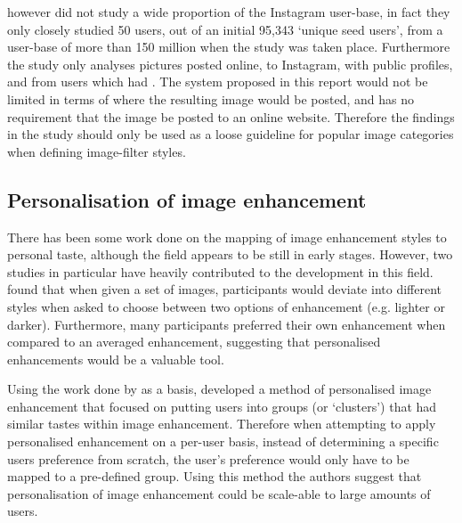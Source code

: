 \documentclass[a4paper,12pt]{report}
\begin{document}
      \cite{hu2014we} however did not study a wide proportion of the Instagram user-base, in fact they only closely studied 50 users, out of an initial 95,343 ‘unique seed users’, from a user-base of more than 150 million when the study was taken place. Furthermore the study only analyses pictures posted online, to Instagram, with public profiles, and from users which had . The system proposed in this report would not be limited in terms of where the resulting image would be posted, and has no requirement that the image be posted to an online website. Therefore the findings in the study should only be used as a loose guideline for popular image categories when defining image-filter styles.

    \subsection{Personalisation of image enhancement}
      There has been some work done on the mapping of image enhancement styles to personal taste, although the field appears to be still in early stages. However, two studies in particular have heavily contributed to the development in this field. \cite{kang2010personalization} found that when given a set of images, participants would deviate into different styles when asked to choose between two options of enhancement (e.g. lighter or darker). Furthermore, many participants preferred their own enhancement when compared to an averaged enhancement, suggesting that personalised enhancements would be a valuable tool.

      Using the work done by \cite{kang2010personalization} as a basis, \cite{caicedo2011collaborative} developed a method of personalised image enhancement that focused on putting users into groups (or ‘clusters’) that had similar tastes within image enhancement. Therefore when attempting to apply personalised enhancement on a per-user basis, instead of determining a specific users preference from scratch, the user's preference would only have to be mapped to a pre-defined group. Using this method the authors suggest that personalisation of image enhancement could be scale-able to large amounts of users.


  \newpage
\end{document}
